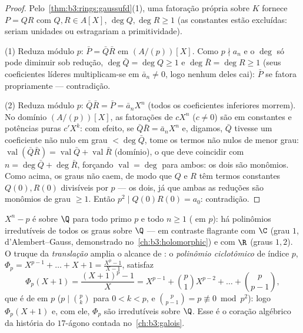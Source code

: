\begin{proof}
Pelo~\cref{thm:b3:rings:gaussufd}(1), uma fatoração própria sobre $K$ fornece
$P = QR$ com $Q, R \in A[X]$, $\deg Q, \deg R \geq 1$ (as constantes estão excluídas: seriam
unidades ou estragariam a primitividade).

(1) Reduza módulo $p$: $\bar P = \bar Q\bar R$ em $(A/(p))[X]$. Como $p \nmid a_n$ e o $\deg$ só
pode diminuir sob redução, $\deg \bar
Q = \deg Q \geq 1$ e $\deg\bar R = \deg R \geq 1$ (seus coeficientes líderes
multiplicam-se em $\bar a_n \neq 0$, logo nenhum deles cai): $\bar P$ se fatora
propriamente --- contradição.

(2) Reduza módulo $p$: $\bar Q \bar R = \bar P = \bar a_n X^n$ (todos os coeficientes inferiores
morrem). No domínio $(A/(p))[X]$, as fatorações de $cX^n$ ($c \ne 0$) são em
constantes e potências puras $c'X^k$: com efeito, se $\bar Q\bar R = \bar a_nX^n$ e,
digamos, $\bar Q$ tivesse um coeficiente não nulo em grau $< \deg\bar Q$,
tome os termos não nulos de menor grau: $\operatorname{val}(\bar Q\bar R) =
\operatorname{val}\bar Q + \operatorname{val}\bar R$ (domínio), o que deve
coincidir com $n = \deg\bar Q + \deg\bar R$, forçando $\operatorname{val} = \deg$ para ambos: os dois são monômios.
Como acima, os graus não caem, de modo que $Q$ e $R$ têm termos
constantes $Q(0), R(0)$ divisíveis por $p$ --- os dois, já que ambas as
reduções são monômios de grau $\geq 1$. Então $p^2 \mid
Q(0)R(0) = a_0$: contradição.
\end{proof}

\begin{example}\label{ex:b3:rings:eisenstein}
$X^n - p$ é  sobre $\Q$ para todo primo $p$ e todo $n
\geq 1$
( em $p$): há polinômios irredutíveis de todos os graus
sobre $\Q$ --- em contraste flagrante com $\C$ (grau $1$,
d'Alembert--Gauss, demonstrado no~\cref{ch:b3:holomorphic}) e com $\R$ (graus
$1, 2$). O truque da \emph{translação} amplia o alcance de
: o \emph{polinômio ciclotômico}
de índice $p$, $\Phi_p = X^{p-1} +
\dots + X + 1 = \frac{X^p - 1}{X - 1}$, satisfaz
\[
\Phi_p(X + 1) = \frac{(X+1)^p - 1}{X}
= X^{p-1} + \binom{p}{1}X^{p-2} + \dots + \binom{p}{p-1},
\]
que é de  em $p$ ($p \mid \binom pk$ para $0 < k < p$, e $\binom{p}{p-1} = p \not\equiv 0 \bmod p^2$): logo $\Phi_p(X+1)$
e, com ele, $\Phi_p$ são irredutíveis sobre $\Q$. Esse é o
coração algébrico da história do $17$-ágono contada no~\cref{ch:b3:galois}.
\end{example}

